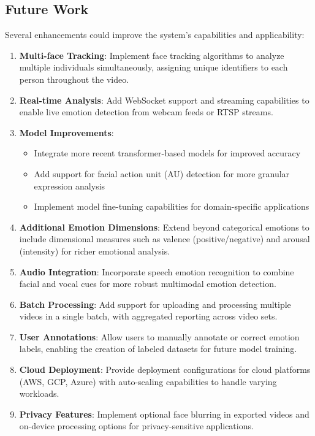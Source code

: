 \subsection{Future Work}

Several enhancements could improve the system's capabilities and applicability:

\begin{enumerate}
    \item \textbf{Multi-face Tracking}: Implement face tracking algorithms to analyze multiple individuals simultaneously, assigning unique identifiers to each person throughout the video.

    \item \textbf{Real-time Analysis}: Add WebSocket support and streaming capabilities to enable live emotion detection from webcam feeds or RTSP streams.

    \item \textbf{Model Improvements}:
    \begin{itemize}
        \item Integrate more recent transformer-based models for improved accuracy
        \item Add support for facial action unit (AU) detection for more granular expression analysis
        \item Implement model fine-tuning capabilities for domain-specific applications
    \end{itemize}

    \item \textbf{Additional Emotion Dimensions}: Extend beyond categorical emotions to include dimensional measures such as valence (positive/negative) and arousal (intensity) for richer emotional analysis.

    \item \textbf{Audio Integration}: Incorporate speech emotion recognition to combine facial and vocal cues for more robust multimodal emotion detection.

    \item \textbf{Batch Processing}: Add support for uploading and processing multiple videos in a single batch, with aggregated reporting across video sets.

    \item \textbf{User Annotations}: Allow users to manually annotate or correct emotion labels, enabling the creation of labeled datasets for future model training.

    \item \textbf{Cloud Deployment}: Provide deployment configurations for cloud platforms (AWS, GCP, Azure) with auto-scaling capabilities to handle varying workloads.

    \item \textbf{Privacy Features}: Implement optional face blurring in exported videos and on-device processing options for privacy-sensitive applications.
\end{enumerate}
